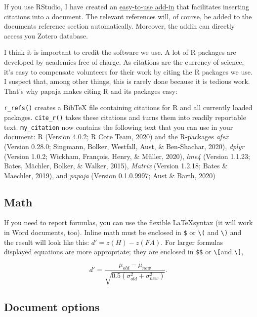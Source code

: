 \documentclass[
  english,
  man]{apa6}
\begin{document}
If you use RStudio, I have created an \href{https://github.com/crsh/citr}{easy-to-use add-in} that facilitates inserting citations into a document.
The relevant references will, of course, be added to the documents reference section automatically.
Moreover, the addin can directly access you Zotero database.

I think it is important to credit the software we use.
A lot of R packages are developed by academics free of charge.
As citations are the currency of science, it's easy to compensate volunteers for their work by citing the R packages we use.
I suspect that, among other things, this is rarely done because it is tedious work.
That's why papaja makes citing R and its packages easy:

\texttt{r\_refs()} creates a BibTeX file containing citations for R and all currently loaded packages.
\texttt{cite\_r()} takes these citations and turns them into readily reportable text.
\texttt{my\_citation} now contains the following text that you can use in your document: R (Version 4.0.2; R Core Team, 2020) and the R-packages \emph{afex} (Version 0.28.0; Singmann, Bolker, Westfall, Aust, \& Ben-Shachar, 2020), \emph{dplyr} (Version 1.0.2; Wickham, François, Henry, \& Müller, 2020), \emph{lme4} (Version 1.1.23; Bates, Mächler, Bolker, \& Walker, 2015), \emph{Matrix} (Version 1.2.18; Bates \& Maechler, 2019), and \emph{papaja} (Version 0.1.0.9997; Aust \& Barth, 2020)

\hypertarget{math}{%
\subsection{Math}\label{math}}

If you need to report formulas, you can use the flexible \LaTeX syntax (it will work in Word documents, too).
Inline math must be enclosed in \texttt{\$} or \texttt{\textbackslash{}(} and \texttt{\textbackslash{})} and the result will look like this: \(d' = z(H) - z(FA)\).
For larger formulas displayed equations are more appropriate; they are enclosed in \texttt{\$\$} or \texttt{\textbackslash{}{[}}and \texttt{\textbackslash{}{]}},

\[
d' = \frac{\mu_{old} - \mu_{new}}{\sqrt{0.5(\sigma^2_{old} + \sigma^2_{new})}}.
\]

\hypertarget{document-options}{%
\subsection{Document options}\label{document-options}}
\end{document}
